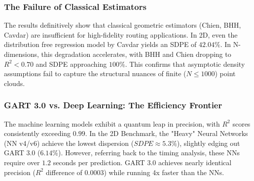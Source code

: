 \documentclass{article}
\begin{document}
\begin{table}[ht]
\centering
\caption{Model Precision Metrics ($R^2$ and SDPE)}
\label{tab:precision_results}
\end{table}

\subsubsection{The Failure of Classical Estimators}
The results definitively show that classical geometric estimators (Chien, BHH, Cavdar) are insufficient for high-fidelity routing applications. In 2D, even the distribution free regression model by Cavdar yields an SDPE of $42.04\%$. In N-dimensions, this degradation accelerates, with BHH and Chien dropping to $R^2 < 0.70$ and SDPE approaching $100\%$. This confirms that asymptotic density assumptions fail to capture the structural nuances of finite ($N \le 1000$) point clouds.

\subsubsection{GART 3.0 vs. Deep Learning: The Efficiency Frontier}
The machine learning models exhibit a quantum leap in precision, with $R^2$ scores consistently exceeding $0.99$. 
In the 2D Benchmark, the "Heavy" Neural Networks (NN v4/v6) achieve the lowest dispersion ($SDPE \approx 5.3\%$), slightly edging out GART 3.0 ($6.14\%$). However, referring back to the timing analysis, these NNs require over $1.2$ seconds per prediction. GART 3.0 achieves nearly identical precision ($R^2$ difference of $0.0003$) while running 4x faster than the NNs.
\end{document}
